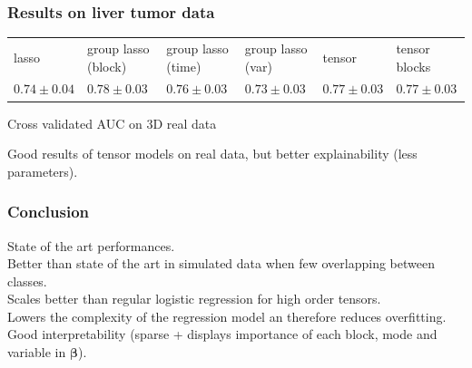 \documentclass{beamer}
\begin{document}
\begin{frame}
    \frametitle{Results on liver tumor data}
    \begin{table}[H]
        \centering
        \label{tab:result_real}
        \renewcommand{\arraystretch}{1.2} 
        \begin{adjustbox}{center}
        \begin{tabular}{|>{\centering\arraybackslash}m{1.1cm}|>{\centering\arraybackslash}m{1.8cm}|>{\centering\arraybackslash}m{1.8cm}|>{\centering\arraybackslash}m{1.8cm}|>{\centering\arraybackslash}m{1.1cm}|>{\centering\arraybackslash}m{1.1cm}|}
            \cline{1-6}
             lasso & group lasso (block) & group lasso (time)& group lasso (var) & tensor & tensor blocks\\
            \cline{1-6} 
             $0.74 \pm 0.04$& $0.78 \pm 0.03$ & $0.76 \pm 0.03$ & $0.73 \pm 0.03$ & $0.77 \pm 0.03$ & $0.77 \pm 0.03$ \\
            \cline{1-6}
        \end{tabular}
        
    \end{adjustbox}
    \parbox{0.9\textwidth}{
    \vspace{0.2 cm}    
    \centering \small Cross validated AUC on 3D real data}
    \vspace{0.3 cm}
    \end{table}

    Good results of tensor models on real data, but better explainability (less parameters).
\end{frame}

\begin{frame}
    \frametitle{Conclusion}
    State of the art performances.\\[15 pt]
    Better than state of the art in simulated data when few overlapping between classes.\\[15 pt]
    Scales better than regular logistic regression for high order tensors.\\[15 pt]
    Lowers the complexity of the regression model an therefore reduces overfitting.\\[15 pt]
    Good interpretability (sparse + displays importance of each block, mode and variable in $\bm{\beta}$).

\end{frame}

\end{document}
